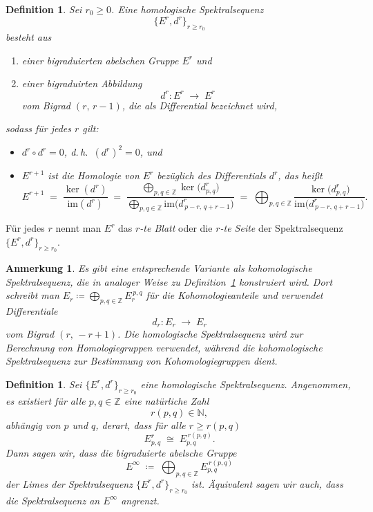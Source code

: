 \documentclass[12pt, hidelinks]{article}
\numberwithin{conj}{section}
\newtheorem{definition}[conj]{Definition}
\newtheorem{remark}[conj]{Anmerkung}
\newcommand{\Z}{\mathbb{Z}}
\begin{document}
\begin{definition}
    \label{homologischeSpektraleSequenz}
    Sei $r_0 \geq 0$. Eine \emph{homologische Spektralsequenz} 
    \[
        \{E^r,d^r\}_{r \geq r_0}
    \]
    besteht aus
    \begin{enumerate}[nolistsep]
        \item einer bigraduierten abelschen Gruppe $E^r$ und
        \item einer bigraduirten Abbildung
              \[
                  d^r : E^r \;\longrightarrow\; E^r
              \]
              vom Bigrad $(r,\,r-1)$, die als \emph{Differential} bezeichnet wird,
    \end{enumerate}
    sodass für jedes $r$ gilt:
    \begin{itemize}[nolistsep]
        \item $d^r \circ d^r = 0$, d.\,h.\ $(d^r)^2 = 0$, und
        \item $E^{r+1}$ ist die Homologie von $E^r$ bezüglich des Differentials $d^r$, das heißt
        \[
            E^{r+1}
            \;=\;
            \frac{\ker(d^r)}{\mathrm{im}(d^r)}
            \;=\;
            \frac{\displaystyle\bigoplus_{p,q \in \Z} \ker\bigl(d^r_{p,q}\bigr)}%
                 {\displaystyle\bigoplus_{p,q \in \Z} \mathrm{im}\!\bigl(d^r_{\,p-r,\,q+r-1}\bigr)}
            \;=\;
            \bigoplus_{p,q \in \Z}
            \frac{\ker\bigl(d^r_{p,q}\bigr)}{\mathrm{im}\!\bigl(d^r_{\,p-r,\,q+r-1}\bigr)}.
        \]
    \end{itemize}
\end{definition}

Für jedes $r$ nennt man $E^r$ das \emph{$r$-te Blatt} oder die \emph{$r$-te Seite} der Spektralsequenz $\{E^r,d^r\}_{r \geq r_0}$.

\begin{remark}
    Es gibt eine entsprechende Variante als \emph{kohomologische Spektralsequenz}, die in analoger Weise zu Definition~\ref{homologischeSpektraleSequenz} konstruiert wird. 
    Dort schreibt man $E_r \coloneqq \bigoplus_{p,q \in \Z} E_{r}^{\,p,q}$ für die Kohomologieanteile und verwendet Differentiale
    \[
        d_r : E_r \;\longrightarrow\; E_r
    \]
    vom Bigrad $(r,\,-r+1)$. Die homologische Spektralsequenz wird zur Berechnung von Homologiegruppen verwendet, während die kohomologische Spektralsequenz zur Bestimmung von Kohomologiegruppen dient.
\end{remark}

\begin{definition}
    Sei $\{E^r, d^r\}_{r \geq r_0}$ eine homologische Spektralsequenz. Angenommen, es existiert für alle $p,q \in \Z$ eine natürliche Zahl
    \[
        r(p,q) \in \mathbb{N},
    \]
    abhängig von $p$ und $q$, derart, dass für alle $r \ge r(p,q)$
    \[
        E^r_{p,q} \;\cong\; E_{p,q}^{\,r(p,q)}.
    \]
    Dann sagen wir, dass die bigraduierte abelsche Gruppe
    \[
        E^\infty \;\coloneqq\; \bigoplus_{p,q \in \Z} E_{p,q}^{\,r(p,q)}
    \]
    der \emph{Limes} der Spektralsequenz $\{E^r, d^r\}_{r \geq r_0}$ ist. Äquivalent sagen wir auch, dass die Spektralsequenz \emph{an} $E^\infty$ \emph{angrenzt}.
\end{definition}
\end{document}

